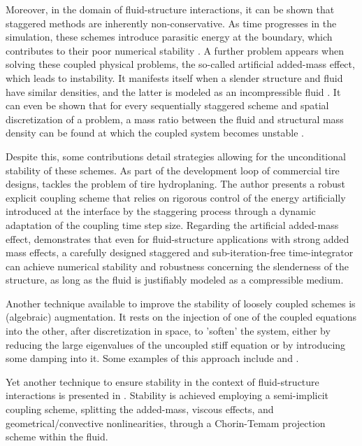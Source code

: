 Moreover, in the domain of fluid-structure interactions, it can be shown that staggered methods are inherently non-conservative.
As time progresses in the simulation, these schemes introduce parasitic energy at the boundary, which contributes to their poor numerical stability \citep{michler_relevance_2003}.
A further problem appears when solving these coupled physical problems, the so-called artificial added-mass effect, which leads to instability.
It manifests itself when a slender structure and fluid have similar densities, and the latter is modeled as an incompressible fluid \citep{causin_added-mass_2005, forster_robust_2007}.
It can even be shown that for every sequentially staggered scheme and spatial discretization of a problem, a mass ratio between the fluid and structural mass density can be found at which the coupled system becomes unstable \citep{forster_artificial_2007}.

Despite this, some contributions detail strategies allowing for the unconditional stability of these schemes.
As part of the development loop of commercial tire designs, \cite{gillard_efficient_2019} tackles the problem of tire hydroplaning.
The author presents a robust explicit coupling scheme that relies on rigorous control of the energy artificially introduced at the interface by the staggering process through a dynamic adaptation of the coupling time step size.
Regarding the artificial added-mass effect, \cite{farhat_robust_2010} demonstrates that even for fluid-structure applications with strong added mass effects, a carefully designed staggered and sub-iteration-free time-integrator can achieve numerical stability and robustness concerning the slenderness of the structure, as long as the fluid is justifiably modeled as a compressible medium.

Another technique available to improve the stability of loosely coupled schemes is (algebraic) augmentation.
It rests on the injection of one of the coupled equations into the other, after discretization in space, to 'soften' the system, either by reducing the large eigenvalues of the uncoupled stiff equation or by introducing some damping into it.
Some examples of this approach include \cite{park_stabilization_1977} and \cite{park_stabilization_1983}.

Yet another technique to ensure stability in the context of fluid-structure interactions is presented in \cite{fernandez_projection_2006}.
Stability is achieved employing a semi-implicit coupling scheme, splitting the added-mass, viscous effects, and geometrical/convective nonlinearities, through a Chorin-Temam projection scheme within the fluid.

